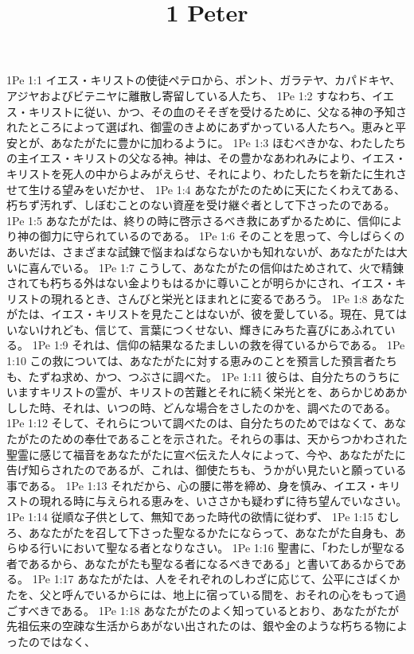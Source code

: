 

\title{1 Peter}

1Pe 1:1  イエス・キリストの使徒ペテロから、ポント、ガラテヤ、カパドキヤ、アジヤおよびビテニヤに離散し寄留している人たち、
1Pe 1:2  すなわち、イエス・キリストに従い、かつ、その血のそそぎを受けるために、父なる神の予知されたところによって選ばれ、御霊のきよめにあずかっている人たちへ。恵みと平安とが、あなたがたに豊かに加わるように。
1Pe 1:3  ほむべきかな、わたしたちの主イエス・キリストの父なる神。神は、その豊かなあわれみにより、イエス・キリストを死人の中からよみがえらせ、それにより、わたしたちを新たに生れさせて生ける望みをいだかせ、
1Pe 1:4  あなたがたのために天にたくわえてある、朽ちず汚れず、しぼむことのない資産を受け継ぐ者として下さったのである。
1Pe 1:5  あなたがたは、終りの時に啓示さるべき救にあずかるために、信仰により神の御力に守られているのである。
1Pe 1:6  そのことを思って、今しばらくのあいだは、さまざまな試錬で悩まねばならないかも知れないが、あなたがたは大いに喜んでいる。
1Pe 1:7  こうして、あなたがたの信仰はためされて、火で精錬されても朽ちる外はない金よりもはるかに尊いことが明らかにされ、イエス・キリストの現れるとき、さんびと栄光とほまれとに変るであろう。
1Pe 1:8  あなたがたは、イエス・キリストを見たことはないが、彼を愛している。現在、見てはいないけれども、信じて、言葉につくせない、輝きにみちた喜びにあふれている。
1Pe 1:9  それは、信仰の結果なるたましいの救を得ているからである。
1Pe 1:10  この救については、あなたがたに対する恵みのことを預言した預言者たちも、たずね求め、かつ、つぶさに調べた。
1Pe 1:11  彼らは、自分たちのうちにいますキリストの霊が、キリストの苦難とそれに続く栄光とを、あらかじめあかしした時、それは、いつの時、どんな場合をさしたのかを、調べたのである。
1Pe 1:12  そして、それらについて調べたのは、自分たちのためではなくて、あなたがたのための奉仕であることを示された。それらの事は、天からつかわされた聖霊に感じて福音をあなたがたに宣べ伝えた人々によって、今や、あなたがたに告げ知らされたのであるが、これは、御使たちも、うかがい見たいと願っている事である。
1Pe 1:13  それだから、心の腰に帯を締め、身を慎み、イエス・キリストの現れる時に与えられる恵みを、いささかも疑わずに待ち望んでいなさい。
1Pe 1:14  従順な子供として、無知であった時代の欲情に従わず、
1Pe 1:15  むしろ、あなたがたを召して下さった聖なるかたにならって、あなたがた自身も、あらゆる行いにおいて聖なる者となりなさい。
1Pe 1:16  聖書に、「わたしが聖なる者であるから、あなたがたも聖なる者になるべきである」と書いてあるからである。
1Pe 1:17  あなたがたは、人をそれぞれのしわざに応じて、公平にさばくかたを、父と呼んでいるからには、地上に宿っている間を、おそれの心をもって過ごすべきである。
1Pe 1:18  あなたがたのよく知っているとおり、あなたがたが先祖伝来の空疎な生活からあがない出されたのは、銀や金のような朽ちる物によったのではなく、

